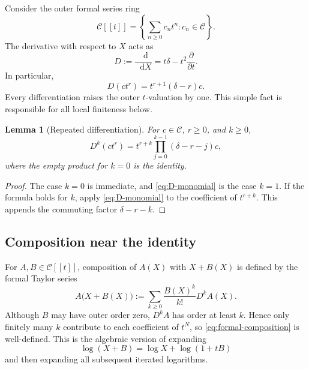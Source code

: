 \documentclass[11pt,oneside]{article}
\theoremstyle{plain}
\newtheorem{lemma}[theorem]{Lemma}
\theoremstyle{definition}
\theoremstyle{remark}
\newcommand{\dd}{\mathop{}\!\mathrm{d}}
\newcommand{\Ccal}{\mathcal{C}}
\begin{document}
Consider the outer formal series ring
\begin{equation}
 \Ccal[[t]]=\left\{\sum_{n\ge0}c_n t^n:c_n\in\Ccal\right\}.
 \label{eq:outer-ring}
\end{equation}
The derivative with respect to \(X\) acts as
\begin{equation}
 D:=\frac{\dd}{\dd X}
 =t\delta-t^2\frac{\partial}{\partial t}.
 \label{eq:D-operator}
\end{equation}
In particular,
\begin{equation}
 D(c t^r)=t^{r+1}(\delta-r)c.
 \label{eq:D-monomial}
\end{equation}
Every differentiation raises the outer \(t\)-valuation by one.  This simple
fact is responsible for all local finiteness below.

\begin{lemma}[Repeated differentiation]
\label{lem:repeated-D}
For \(c\in\Ccal\), \(r\ge0\), and \(k\ge0\),
\begin{equation}
 D^k(c t^r)
 =t^{r+k}\prod_{j=0}^{k-1}(\delta-r-j)c,
 \label{eq:repeated-D}
\end{equation}
where the empty product for \(k=0\) is the identity.
\end{lemma}

\begin{proof}
The case \(k=0\) is immediate, and \eqref{eq:D-monomial} is the case \(k=1\).
If the formula holds for \(k\), apply \eqref{eq:D-monomial} to the coefficient
of \(t^{r+k}\).  This appends the commuting factor \(\delta-r-k\).
\end{proof}

\subsection{Composition near the identity}

For \(A,B\in\Ccal[[t]]\), composition of \(A(X)\) with \(X+B(X)\) is defined
by the formal Taylor series
\begin{equation}
 A\bigl(X+B(X)\bigr)
 :=\sum_{k\ge0}\frac{B(X)^k}{k!}D^k A(X).
 \label{eq:formal-composition}
\end{equation}
Although \(B\) may have outer order zero, \(D^kA\) has order at least \(k\).
Hence only finitely many \(k\) contribute to each coefficient of \(t^N\), so
\eqref{eq:formal-composition} is well-defined.  This is the algebraic version
of expanding
\[
 \log(X+B)=\log X+\log(1+tB)
\]
and then expanding all subsequent iterated logarithms.
\end{document}
